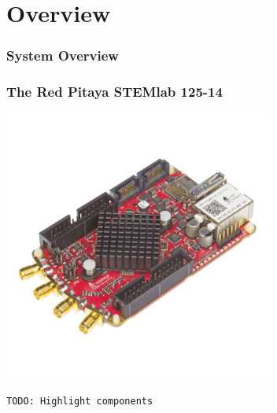 \section{Overview}

\begin{frame}
    \frametitle{System Overview}
    \begin{center}
        
    \end{center}
\end{frame}

\begin{frame}
    \frametitle{The Red Pitaya STEMlab 125-14}
    \begin{center}
        \includegraphics[width=0.667\textwidth]{images/stemlab125-14-photo.png}

        \texttt{TODO: Highlight components}
    \end{center}
\end{frame}
